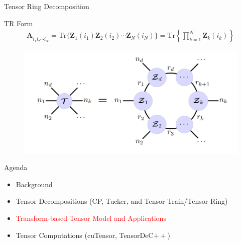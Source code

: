 \documentclass[t, 10pt, handout, aspectratio=169]{beamer}
\begin{document}
\begin{frame}{Tensor Ring Decomposition}
\large

\begin{block}{TR Form}
$$
\begin{aligned}
\underline{\mathbf{A}}_{i_1i_2\cdots i_N}=\text{Tr}\{\mathbf{Z}_1(i_1)\mathbf{Z}_2(i_2)\cdots\mathbf{Z}_N(i_N)\}
=\text{Tr}\left\{\prod_{k=1}^{N}\mathbf{Z}_k(i_k)\right\}
\end{aligned}
$$
\end{block}
\begin{figure}
	\centering  
	\includegraphics[width=0.55\linewidth]{figs/tensor_ring_arch.png}
	\label{fig:tensor_ring_arch}
\end{figure}
\end{frame}

\begin{frame}{Agenda}
\begin{itemize}
    \large \item {Background}
    \large \item {Tensor Decompositions (CP, Tucker, and Tensor-Train/Tensor-Ring)}
    \large \item \textcolor{red}{Transform-based Tensor Model and Applications}
    \large \item{Tensor Computations (cuTensor, TensorDeC$++$)}
\end{itemize}
\end{frame}

\end{document}
